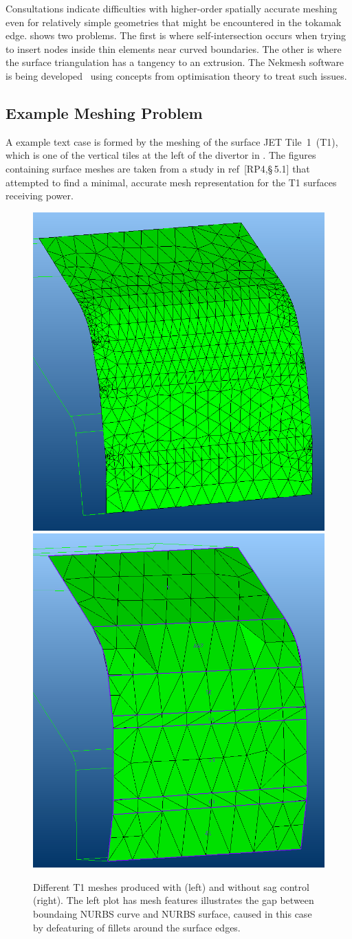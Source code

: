 Consultations indicate difficulties with higher-order spatially accurate meshing
even for relatively simple geometries that might be encountered in the tokamak edge.
 shows two problems. The first is where  self-intersection occurs when
trying to insert nodes  inside thin elements near curved boundaries. The other is
where the surface triangulation has a tangency to an extrusion. The Nekmesh
software is being developed~\cite{Tu17fram,Tu18Curv} using concepts from optimisation theory to 
treat such issues.

\clearpage
\subsection{Example Meshing Problem} \label{sec:meshprob}
A example text case is formed by the meshing of the surface JET Tile~1~(T1),
which is one of the vertical tiles at the left of the divertor in .
The figures containing surface meshes are taken from a study in ref~[RP4,\S\,5.1]\cite{Wa19}
that attempted to find a minimal, accurate mesh representation for the 
T1 surfaces receiving power.
\begin{figure}
\centerline{
\includegraphics[width=0.42\columnwidth]{../png/t2t5}
\includegraphics[width=0.4\columnwidth]{../png/t2t2}
}
\caption{
Different T1 meshes produced with (left) and without sag control (right).
The left plot has mesh features illustrates the gap between boundaing NURBS curve and NURBS surface,
caused in this case by defeaturing of fillets around the surface edges.
\label{fig:meshsag}}
\end{figure}

